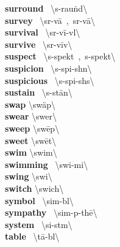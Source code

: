 \documentclass[10pt,a4paper]{article}
\begin{document}
\begin{multicols}{2}
\textbf{ surround }\quad \ \textbackslash s\textschwa -\textprimstress rau\. nd\textbackslash \\
\textbf{ survey }\quad \ \textbackslash s\textschwa r-\textprimstress v\={a}\ ,\ \textprimstress s\textschwa r-\textsecstress v\={a}\textbackslash \\
\textbf{ survival }\quad \ \textbackslash s\textschwa r-\textprimstress v\={i}-v\textschwa l\textbackslash \\
\textbf{ survive }\quad \ \textbackslash s\textschwa r-\textprimstress v\={i}v\textbackslash \\
\textbf{ suspect }\quad \ \textbackslash \textprimstress s\textschwa -\textsecstress spekt\ ,\ s\textschwa -\textprimstress spekt\textbackslash \\
\textbf{ suspicion }\quad \ \textbackslash s\textschwa -\textprimstress spi-sh\textschwa n\textbackslash \\
\textbf{ suspicious }\quad \ \textbackslash s\textschwa -\textprimstress spi-sh\textschwa s\textbackslash \\
\textbf{ sustain }\quad \ \textbackslash s\textschwa -\textprimstress st\={a}n\textbackslash \\
\textbf{ swap }\quad \textbackslash \textprimstress sw\"{a}p\textbackslash \\
\textbf{ swear }\quad \textbackslash \textprimstress swer\textbackslash \\
\textbf{ sweep }\quad \textbackslash \textprimstress sw\={e}p\textbackslash \\
\textbf{ sweet }\quad \textbackslash \textprimstress sw\={e}t\textbackslash \\
\textbf{ swim }\quad \textbackslash \textprimstress swim\textbackslash \\
\textbf{ swimming }\quad \ \textbackslash \textprimstress swi-mi\engma \textbackslash \\
\textbf{ swing }\quad \textbackslash \textprimstress swi\engma \textbackslash \\
\textbf{ switch }\quad \textbackslash \textprimstress swich\textbackslash \\
\textbf{ symbol }\quad \ \textbackslash \textprimstress sim-b\textschwa l\textbackslash \\
\textbf{ sympathy }\quad \ \textbackslash \textprimstress sim-p\textschwa -th\={e}\textbackslash \\
\textbf{ system }\quad \ \textbackslash \textprimstress si-st\textschwa m\textbackslash \\
\textbf{ table }\quad \ \textbackslash \textprimstress t\={a}-b\textschwa l\textbackslash \\

\end{multicols}
\end{document}

